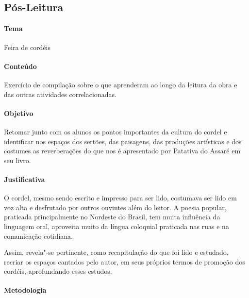 \documentclass[12pt]{extarticle}
\begin{document}

\subsection{Pós-Leitura}

\paragraph{Tema} Feira de cordéis

\paragraph{Conteúdo} Exercício de compilação sobre o que aprenderam ao longo da leitura da obra e das outras 
atividades correlacionadas. 

\paragraph{Objetivo} Retomar junto com os alunos os pontos importantes da cultura do cordel e identificar 
nos espaços dos sertões, das paisagens, das produções artísticas e dos costumes as reverberações do que nos 
é apresentado por Patativa do Assaré em seu livro. 

\paragraph{Justificativa} O cordel, mesmo sendo escrito e impresso para ser lido, costumava
ser lido em voz alta e desfrutado por outros ouvintes
além do leitor. A poesia popular, praticada principalmente
no Nordeste do Brasil, tem muita influência da linguagem
oral, aproveita muito da língua coloquial praticada nas ruas
e na comunicação cotidiana.

Assim, revela"-se pertinente, como recapitulação do que foi lido e estudado, recriar os espaços 
cantados pelo autor, em seus próprios termos de promoção dos cordéis, aprofundando esses estudos.

\paragraph{Metodologia}
\end{document}
